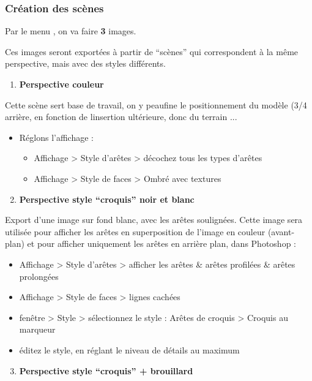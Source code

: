 \documentclass[a4paper,12pt,french]{sphinxmanual}
\begin{document}
\subsubsection{Création des scènes}
\label{psd/prepa-image_su+psd:creation-des-scenes}
Par le menu , on va faire \textbf{3} images.

Ces images seront exportées à partir de ``scènes'' qui correspondent à la même perspective, mais avec des styles différents.
\begin{enumerate}
\item {} 
\textbf{Perspective couleur}

\end{enumerate}

Cette scène sert base de travail, on y peaufine  le positionnement du modèle (3/4 arrière, en fonction de linsertion ultérieure, donc du terrain ...
\begin{itemize}
\item {} 
Réglons l'affichage :
\begin{itemize}
\item {} 
Affichage \textgreater{} Style d'arêtes \textgreater{} décochez tous les types d'arêtes

\item {} 
Affichage \textgreater{} Style de faces \textgreater{} Ombré avec textures

\end{itemize}

\end{itemize}
\begin{enumerate}
\setcounter{enumi}{1}
\item {} 
\textbf{Perspective style ``croquis'' noir et blanc}

\end{enumerate}

Export d'une image sur fond blanc, avec les arêtes soulignées. Cette image sera utilisée pour afficher les arêtes en superposition de l'image en couleur (avant-plan) et pour afficher uniquement les arêtes en arrière plan, dans Photoshop :
\begin{itemize}
\item {} 
Affichage \textgreater{} Style d'arêtes \textgreater{} afficher les arêtes \& arêtes profilées \& arêtes prolongées

\item {} 
Affichage \textgreater{} Style de faces \textgreater{} lignes cachées

\item {} 
fenêtre \textgreater{} Style \textgreater{} sélectionnez le style : Arêtes de croquis \textgreater{} Croquis au marqueur

\item {} 
éditez le style, en réglant le niveau de détails au maximum

\end{itemize}
\begin{enumerate}
\setcounter{enumi}{2}
\item {} 
\textbf{Perspective style ``croquis'' + brouillard}

\end{enumerate}
\end{document}
